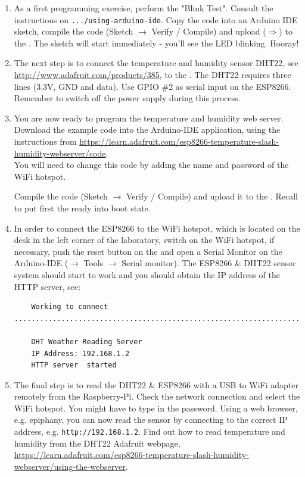 \begin{enumerate}
\item As a first  programming exercise, perform the "Blink Test". Consult the instructions on
{\tt .../using-arduino-ide}.
Copy the code into an Arduino IDE sketch, compile the code (Sketch $\rightarrow$ Verify / Compile) and upload ($\Rightarrow$) to the \microcontroller. 
The sketch will start immediately - you'll see the LED blinking. Hooray!

\item The next step is to connect the temperature and humidity sensor DHT22, see \url{http://www.adafruit.com/products/385}, to the \microcontroller. The DHT22 requires  three lines (3.3V, GND and data). Use GPIO \#2 as serial input on the ESP8266. Remember to switch off the power supply during this process.


\item You are now ready to program the temperature and humidity web server. 
Download the example code into the Arduino-IDE application, using the instructions from \url{https://learn.adafruit.com/esp8266-temperature-slash-humidity-webserver/code}. \\
You will need to change this code by adding the name and password of the WiFi hotspot.
%

%
Compile the code (Sketch $\rightarrow$ Verify / Compile) and upload it
to the \microcontroller.  Recall to put first the \microcontroller ready into boot state.

\item In order to connect the ESP8266 \microcontroller to the WiFi hotspot, which  is located on the desk in the left corner of the laboratory, switch on the WiFi hotspot, if necessary, push the reset button on the \microcontroller and 
open a Serial Monitor on the  Arduino-IDE  ($\rightarrow$ Tools  $\rightarrow$ Serial monitor).
The ESP8266 \& DHT22 sensor system should start to work 
and you  should  obtain the IP address of the HTTP server, see:
\begin{verbatim}
    Working to connect ................................................................................................

    DHT Weather Reading Server
    IP Address: 192.168.1.2
    HTTP server  started
\end{verbatim}

\item The final step is to read the DHT22 \& ESP8266 with a USB to WiFi adapter
 remotely from  the Raspberry-Pi.
   Check the network connection and select the WiFi hotspot. You might have to type in the password. Using a web browser, e.g. epiphany, you can now read the sensor by connecting to the correct IP address, e.g. {\tt http://192.168.1.2}.
Find out how to read temperature and humidity from the DHT22 Adafruit webpage, 
\url{https://learn.adafruit.com/esp8266-temperature-slash-humidity-webserver/using-the-webserver}.

 
\end{enumerate}

